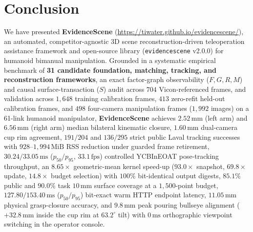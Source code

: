 \documentclass[10pt,journal]{IEEEtran}
\begin{document}
\section{Conclusion}
\label{sec:conclusion}
We have presented \textbf{EvidenceScene} (\url{https://tiwater.github.io/evidencescene/}), an automated, competitor-agnostic 3D scene reconstruction-driven teleoperation assistance framework and open-source library (\texttt{evidencescene} v2.0.0) for humanoid bimanual manipulation. Grounded in a systematic empirical benchmark of \textbf{31 candidate foundation, matching, tracking, and reconstruction frameworks}, an exact factor-graph observability ($F,G,R,M$) and causal surface-transaction ($S$) audit across $704$ Vicon-referenced frames, and validation across $1{,}648$ training calibration frames, $413$ zero-refit held-out calibration frames, and $498$ four-camera manipulation frames ($1{,}992$ images) on a 61-link humanoid manipulator, \textbf{EvidenceScene} achieves $2.52\,\mathrm{mm}$ (left arm) and $6.56\,\mathrm{mm}$ (right arm) median bilateral kinematic closure, $1.60\,\mathrm{mm}$ dual-camera cup rim agreement, $191/204$ and $136/295$ strict public Laval tracking successes with $928$--$1{,}994\,\mathrm{MiB}$ RSS reduction under guarded frame retirement, $30.24 / 33.05\,\mathrm{ms}$ ($p_{50}/p_{95}$, $33.1\,\mathrm{fps}$) controlled YCBInEOAT pose-tracking throughput, an $8.65\times$ geometric-mean kernel speed-up ($93.0\times$ snapshot, $69.8\times$ update, $14.8\times$ budget selection) with $100\%$ bit-identical output digests, $85.1\%$ public and $90.0\%$ task $10\,\mathrm{mm}$ surface coverage at a $1{,}500$-point budget, $127.80 / 153.40\,\mathrm{ms}$ ($p_{50}/p_{95}$) bit-exact warm HTTP endpoint latency, $11.05\,\mathrm{mm}$ physical grasp-closure accuracy, and $9.8\,\mathrm{mm}$ peak pouring bullseye alignment ($+32.8\,\mathrm{mm}$ inside the cup rim at $63.2^\circ$ tilt) with $0\,\mathrm{ms}$ orthographic viewpoint switching in the operator console.
\end{document}
